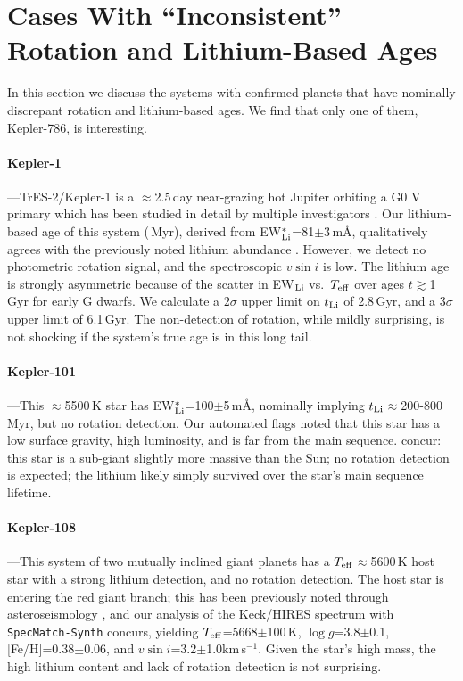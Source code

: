 \documentclass[11pt,twocolumn,tighten,linenumbers]{aastex63}
\newcommand{\kms}{{km\,s$^{-1}$}}
\begin{document}
\section{Cases With ``Inconsistent'' Rotation and Lithium-Based Ages}
\label{app:inconsistent}

In this section we discuss the systems with confirmed planets that
have nominally discrepant rotation and lithium-based ages.  We find
that only one of them, Kepler-786, is interesting.

\paragraph{Kepler-1}---TrES-2/Kepler-1 \citep{2006ApJ...651L..61O} is
a $\approx$2.5\,day near-grazing hot Jupiter orbiting a G0 V primary
which has been studied in detail by multiple investigators
\citep[e.g.][]{2007ApJ...664.1190S,2008ApJ...682.1283W,2011ApJ...733...36K,2011MNRAS.417.2166S}.
Our lithium-based age of this system (\trestwotli\,Myr), derived from
EW$_{\rm Li}^{\ast}$=81$\pm$3\,m\AA, qualitatively agrees with the
previously noted lithium abundance \citep{2007ApJ...664.1190S}.
However, we detect no photometric rotation signal, and the
spectroscopic $v\sin i$ is low.  The lithium age is strongly
asymmetric because of the scatter in EW$_{\rm Li}$ vs.~$T_{\rm eff}$
over ages $t$$\gtrsim$1\,Gyr for early G dwarfs.  We calculate a
$2\sigma$ upper limit on $t_{\rm Li}$ of 2.8\,Gyr, and a $3\sigma$
upper limit of 6.1\,Gyr.  The non-detection of rotation, while mildly
surprising, is not shocking if the system's true age is in this long
tail.

\paragraph{Kepler-101}---This $\approx$5500\,K star has EW$_{\rm
Li}^{\ast}$=100$\pm$5\,m\AA, nominally implying $t_{\rm
Li}$$\approx$200-800\,Myr, but no rotation detection.  Our automated
flags noted that this star has a low surface gravity, high luminosity,
and is far from the main sequence.  \citet{2014A&A...572A...2B}
concur: this star is a sub-giant slightly more massive than the Sun;
no rotation detection is expected; the lithium likely simply survived
over the star's main sequence lifetime.

\paragraph{Kepler-108}---This system of two mutually inclined giant
planets \citep{2017AJ....153...45M} has a $T_{\rm
eff}$$\approx$5600\,K host star with a strong lithium detection, and
no rotation detection.  The host star is entering the red giant
branch; this has been previously noted through asteroseismology
\citep{2013ApJ...767..127H}, and our analysis of the Keck/HIRES
spectrum with \texttt{SpecMatch-Synth} \citep{2017AJ....154..107P}
concurs, yielding $T_{\rm eff}$=5668$\pm$100\,K, $\log g$=3.8$\pm$0.1,
[Fe/H]=0.38$\pm$0.06, and $v\sin i$=3.2$\pm$1.0\kms.  Given the star's
high mass, the high lithium content and lack of rotation detection is
not surprising.
\end{document}
